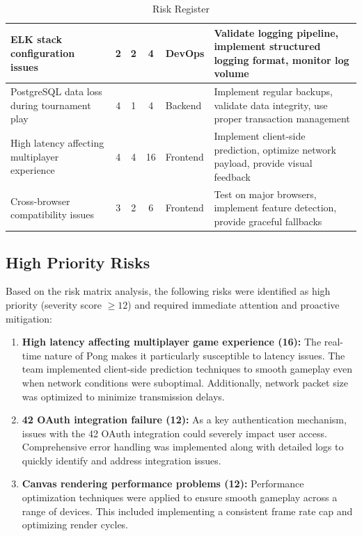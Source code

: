 \begin{table}[H]
\begin{tabular}{|p{3.2cm}|c|c|c|p{1.5cm}|p{5cm}|}
    \hline
    ELK stack configuration issues & 2 & 2 & 4 & DevOps & Validate logging pipeline, implement structured logging format, monitor log volume \\
    \hline
    PostgreSQL data loss during tournament play & 4 & 1 & 4 & Backend & Implement regular backups, validate data integrity, use proper transaction management \\
    \hline
    High latency affecting multiplayer experience & 4 & 4 & 16 & Frontend & Implement client-side prediction, optimize network payload, provide visual feedback \\
    \hline
    Cross-browser compatibility issues & 3 & 2 & 6 & Frontend & Test on major browsers, implement feature detection, provide graceful fallbacks \\
    \hline
    \end{tabular}
    \caption{Risk Register}
    \label{tab:risk_register}
\end{table}

\subsection{High Priority Risks}
Based on the risk matrix analysis, the following risks were identified as high priority (severity score $\geq 12$) and required immediate attention and proactive mitigation:

\begin{enumerate}
    \item \textbf{High latency affecting multiplayer game experience (16):} The real-time nature of Pong makes it particularly susceptible to latency issues. The team implemented client-side prediction techniques to smooth gameplay even when network conditions were suboptimal. Additionally, network packet size was optimized to minimize transmission delays.
    

    \item \textbf{42 OAuth integration failure (12):} As a key authentication mechanism, issues with the 42 OAuth integration could severely impact user access. Comprehensive error handling was implemented along with detailed logs to quickly identify and address integration issues.
    
    \item \textbf{Canvas rendering performance problems (12):} Performance optimization techniques were applied to ensure smooth gameplay across a range of devices. This included implementing a consistent frame rate cap and optimizing render cycles.
\end{enumerate}

